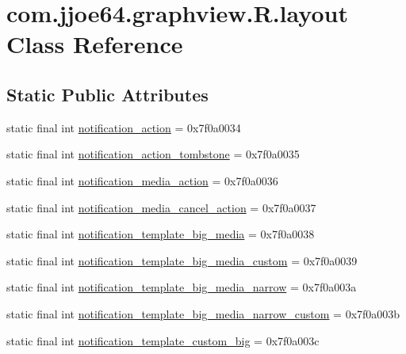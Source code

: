 \hypertarget{classcom_1_1jjoe64_1_1graphview_1_1_r_1_1layout}{}\section{com.\+jjoe64.\+graphview.\+R.\+layout Class Reference}
\label{classcom_1_1jjoe64_1_1graphview_1_1_r_1_1layout}
\subsection*{Static Public Attributes}
\begin{DoxyCompactItemize}
\item 
static final int \mbox{\hyperlink{classcom_1_1jjoe64_1_1graphview_1_1_r_1_1layout_ae32bcd38d98a4a6171c8ea1740d1f5ce}{notification\+\_\+action}} = 0x7f0a0034
\item 
static final int \mbox{\hyperlink{classcom_1_1jjoe64_1_1graphview_1_1_r_1_1layout_a031097b5fe6d963c5b0eafc65e48e880}{notification\+\_\+action\+\_\+tombstone}} = 0x7f0a0035
\item 
static final int \mbox{\hyperlink{classcom_1_1jjoe64_1_1graphview_1_1_r_1_1layout_a9abac9c254e95d3981a0f461bdd12f7e}{notification\+\_\+media\+\_\+action}} = 0x7f0a0036
\item 
static final int \mbox{\hyperlink{classcom_1_1jjoe64_1_1graphview_1_1_r_1_1layout_a1b205cd747942454a16027abc94d8c08}{notification\+\_\+media\+\_\+cancel\+\_\+action}} = 0x7f0a0037
\item 
static final int \mbox{\hyperlink{classcom_1_1jjoe64_1_1graphview_1_1_r_1_1layout_a3c5a72b6bea1ce7afb07f1a3d0e14e28}{notification\+\_\+template\+\_\+big\+\_\+media}} = 0x7f0a0038
\item 
static final int \mbox{\hyperlink{classcom_1_1jjoe64_1_1graphview_1_1_r_1_1layout_a22b4d8e78ff442e6a14a63a5f1a67e08}{notification\+\_\+template\+\_\+big\+\_\+media\+\_\+custom}} = 0x7f0a0039
\item 
static final int \mbox{\hyperlink{classcom_1_1jjoe64_1_1graphview_1_1_r_1_1layout_a4dd38faf7afbae90a8e094ef2fa2d232}{notification\+\_\+template\+\_\+big\+\_\+media\+\_\+narrow}} = 0x7f0a003a
\item 
static final int \mbox{\hyperlink{classcom_1_1jjoe64_1_1graphview_1_1_r_1_1layout_a2835efbda4c02ea18431206923f5562c}{notification\+\_\+template\+\_\+big\+\_\+media\+\_\+narrow\+\_\+custom}} = 0x7f0a003b
\item 
static final int \mbox{\hyperlink{classcom_1_1jjoe64_1_1graphview_1_1_r_1_1layout_a3602776815f6d6b65177018195026659}{notification\+\_\+template\+\_\+custom\+\_\+big}} = 0x7f0a003c

\end{DoxyCompactItemize}
